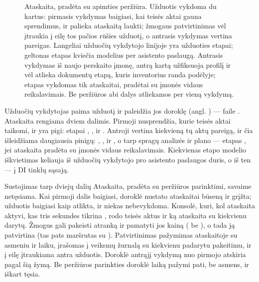 \begin{figure}[H]
\actorlegend
\caption{Ataskaita, pradėta su apimties peržiūra. Užduotis vykdoma du kartus: pirmasis
  vykdymas baigiasi, kai teisės aktai gauna sprendimus, ir palieka ataskaitą laukti; žmogaus
  patvirtinimas vėl įtraukia į eilę tos pačios rūšies užduotį, o antrasis vykdymas vertina
  pareigas. Langeliai užduočių vykdytojo linijoje yra užduoties etapai; geltonas etapas kviečia
  modelius per asistento paslaugą. Antrasis vykdymas iš naujo perskaito įmonę, antrą kartą
  užfiksuoja profilį ir vėl atlieka dokumentų etapą, kuris
  inventorius randa podėlyje; etapas  vykdomas tik ataskaitai, pradėtai su
  įmonės vidaus reikalavimais. Be peržiūros abi dalys atliekamos per vieną
  vykdymą.}\label{fig:arch:report}
\end{figure}

Užduočių vykdytojas paima užduotį ir paleidžia jos doroklę (angl. ) ---
 faile . Ataskaita rengiama dviem dalimis. Pirmoji
nusprendžia, kurie teisės aktai taikomi, ir yra pigi: etapai ,
,  ir . Antroji vertina kiekvieną tų aktų
pareigą, ir čia išleidžiama daugiausia pinigų: , ,
 ir , o tarp spragų analizės ir plano --- etapas
, jei ataskaita pradėta su įmonės vidaus reikalavimais. Kiekvienas etapo
modelio iškvietimas keliauja iš užduočių vykdytojo pro asistento paslaugos duris, o iš ten ---
į DI tinklų sąsają.

\begin{humanbox}{Sustojimas tarp dviejų dalių}
Ataskaita, pradėta su peržiūros parinktimi, savaime netęsiama. Kai pirmoji dalis baigiasi,
doroklė nustato ataskaitai būseną  ir grįžta; užduotis baigiasi kaip
atlikta, ir niekas nebevykdoma. Konsolė, kuri, kol ataskaita aktyvi, kas tris sekundes
tikrina , rodo teisės aktus ir ką ataskaita su kiekvienu
darytų. Žmogus gali pakeisti atranką ir pamatyti jos kainą (
be ), o tada ją patvirtina (tas pats maršrutas su ).
Patvirtinimas pažymimas ataskaitoje su asmeniu ir laiku, įrašomas į veiksmų žurnalą su
kiekvienu padarytu pakeitimu, ir į eilę įtraukiama antra  užduotis.
Doroklė antrąjį vykdymą nuo pirmojo atskiria pagal šią žymą. Be peržiūros parinkties doroklė
laiką pažymi pati, be asmens, ir iškart tęsia.
\end{humanbox}

